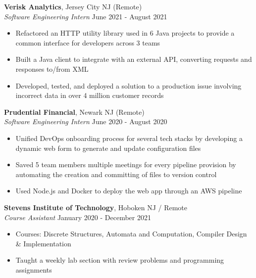 \documentclass{article}
\begin{document}
\noindent
\textbf{Verisk Analytics}, Jersey City NJ (Remote)\\
\textit{Software Engineering Intern}
\hfill
June 2021 - August 2021\\
\vspace{-1em}
\begin{itemize}
\item Refactored an HTTP utility library used in 6 Java projects to provide a common interface for developers across 3 teams
\item Built a Java client to integrate with an external API, converting requests and responses to/from XML
\item Developed, tested, and deployed a solution to a production issue involving incorrect data in over 4 million customer records



\end{itemize}

\noindent
\textbf{Prudential Financial}, Newark NJ (Remote)\\
\textit{Software Engineering Intern}
\hfill
June 2020 - August 2020\\
\vspace{-1em}
\begin{itemize}
\item Unified DevOps onboarding process for several tech stacks by developing a dynamic web form to generate and update configuration files
\item Saved 5 team members multiple meetings for every pipeline provision by automating the creation and committing of files to version control
\item Used Node.js and Docker to deploy the web app through an AWS pipeline
\end{itemize}

\noindent
\textbf{Stevens Institute of Technology}, Hoboken NJ / Remote\\
\textit{Course Assistant}
\hfill
January 2020 - December 2021\\
\vspace{-1em}
\begin{itemize}
\item Courses: Discrete Structures, Automata and Computation, Compiler Design \& Implementation
\item Taught a weekly lab section with review problems and programming assignments
\end{itemize}
\end{document}
